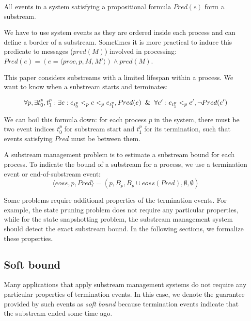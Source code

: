 \begin{definition}[Substream]
All events in a system satisfying a propositional formula $Pred(e)$ form a substream.
\end{definition}

We have to use system events as they are ordered inside each process and can define a border of a substream. Sometimes it is more practical to induce this predicate to messages ($pred(M)$) involved in processing: $Pred(e) = (e = \langle proc, p, M, M'\rangle) \wedge pred(M)$.

This paper considers substreams with a limited lifespan within a process. We want to know when a substream starts and terminates: 

\begin{equation}
\forall p, \exists t_0^p, t_1^p: \exists e: e_{t_0^p} <_p e <_p e_{t_1^p}, Pred(e) \And \forall e': e_{t_1^p} <_p e', \neg Pred(e') 
\end{equation}

We can boil this formula down: for each process $p$ in the system, there must be two event indices $t_0^p$ for substream start and $t_1^p$ for its termination, such that events satisfying $Pred$ must be between them. 

\begin{definition}
A substream management problem is to estimate a substream bound for each process. To indicate the bound of a substream for a process, we use a termination event or end-of-substream event:
\begin{equation}
  \langle eoss, p, Pred \rangle = (p, B_p, B_p\cup eoss(Pred), \emptyset, \emptyset)  
\end{equation}
\end{definition}

Some problems require additional properties of the termination events. For example, the state pruning problem does not require any particular properties, while for the state snapshotting problem, the substream management system should detect the exact substream bound. In the following sections, we formalize these properties. 

\subsection{Soft bound}

Many applications that apply substream management systems do not require any particular properties of termination events. In this case, we denote the guarantee provided by such events as {\em soft bound} because termination events indicate that the substream ended some time ago.

